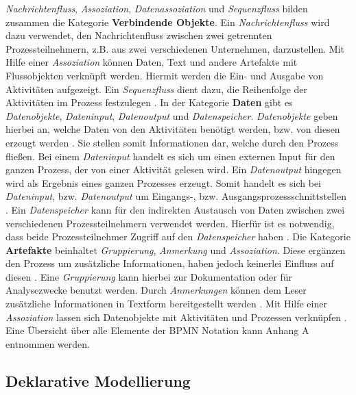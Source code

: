 \textit{Nachrichtenfluss}, \textit{Assoziation}, \textit{Datenassoziation} und \textit{Sequenzfluss} bilden zusammen die Kategorie \textbf{Verbindende Objekte}. Ein \textit{Nachrichtenfluss} wird dazu verwendet, den Nachrichtenfluss zwischen zwei getrennten Prozessteilnehmern, z.B. aus zwei verschiedenen Unternehmen, darzustellen. Mit Hilfe einer \textit{Assoziation} können Daten, Text und andere Artefakte mit Flussobjekten verknüpft werden. Hiermit werden die Ein- und Ausgabe von Aktivitäten aufgezeigt. Ein \textit{Sequenzfluss} dient dazu, die Reihenfolge der Aktivitäten im Prozess festzulegen \cite{white2004introduction}. \newline
In der Kategorie \textbf{Daten} gibt es \textit{Datenobjekte}, \textit{Dateninput}, \textit{Datenoutput} und \textit{Datenspeicher}. \textit{Datenobjekte} geben hierbei an, welche Daten von den Aktivitäten benötigt werden, bzw. von diesen erzeugt werden \cite{white2004introduction}. Sie stellen somit Informationen dar, welche durch den Prozess fließen. Bei einem  \textit{Dateninput} handelt es sich um einen externen Input für den ganzen Prozess, der von einer Aktivität gelesen wird. Ein \textit{Datenoutput} hingegen wird als Ergebnis eines ganzen Prozesses erzeugt. Somit handelt es sich bei \textit{Dateninput}, bzw. \textit{Datenoutput} um Eingangs-, bzw. Ausgangsprozessschnittstellen \cite{bpmnposter}. Ein \textit{Datenspeicher} kann für den indirekten Austausch von Daten zwischen zwei verschiedenen Prozessteilnehmern verwendet werden. Hierfür ist es notwendig, dass beide Prozessteilnehmer Zugriff auf den \textit{Datenspeicher} haben \cite{allweyer2013}.\newline
Die Kategorie \textbf{Artefakte} beinhaltet \textit{Gruppierung}, \textit{Anmerkung} und \textit{Assoziation}. Diese ergänzen den Prozess um zusätzliche Informationen, haben jedoch keinerlei Einfluss auf diesen \cite{gpfert2012}. Eine \textit{Gruppierung} kann hierbei zur Dokumentation oder für Analysezwecke benutzt werden. Durch \textit{Anmerkungen} können dem Leser zusätzliche Informationen in Textform bereitgestellt werden \cite{white2004introduction}. Mit Hilfe einer \textit{Assoziation} lassen sich Datenobjekte mit Aktivitäten und Prozessen verknüpfen \cite{bpmnposter}. \newline
 Eine Übersicht über alle Elemente der BPMN Notation kann Anhang A entnommen werden.\newline





\subsection{Deklarative Modellierung}

